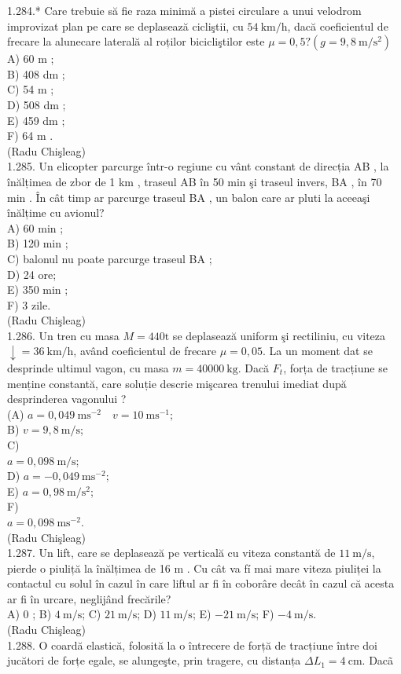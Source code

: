 {1.284.* Care trebuie să fie raza minimă a pistei circulare a unui velodrom improvizat plan pe care se deplasează cicliştii, cu $54 \mathrm{~km} / \mathrm{h}$, dacă coeficientul de frecare la alunecare laterală al roților bicicliştilor este $\mu=0,5 ?\left(g=9,8 \mathrm{~m} / \mathrm{s}^{2}\right)$\\
A) 60 m ;\\
B) 408 dm ;\\
C) 54 m ;\\
D) 508 dm ;\\
E) 459 dm ;\\
F) 64 m .\\
(Radu Chişleag)\\
1.285. Un elicopter parcurge într-o regiune cu vânt constant de direcția AB , la înălțimea de zbor de 1 km , traseul AB în 50 min şi traseul invers, BA , în 70 min . În cât timp ar parcurge traseul BA , un balon care ar pluti la aceeaşi înălțime cu avionul?\\
A) 60 min ;\\
B) 120 min ;\\
C) balonul nu poate parcurge traseul BA ;\\
D) 24 ore;\\
E) 350 min ;\\
F) 3 zile.\\
(Radu Chişleag)\\
1.286. Un tren cu masa $M=440 \mathrm{t}$ se deplasează uniform şi rectiliniu, cu viteza $\downarrow=36 \mathrm{~km} / \mathrm{h}$, având coeficientul de frecare $\mu=0,05$. La un moment dat se desprinde ultimul vagon, cu masa $m=40000 \mathrm{~kg}$. Dacă $F_{t}$, forța de tracțiune se menține constantă, care soluție descrie mişcarea trenului imediat după desprinderea vagonului ?\\
(A) $a=0,049 \mathrm{~ms}^{-2} \quad v=10 \mathrm{~ms}^{-1} ;$\\
B) $v=9,8 \mathrm{~m} / \mathrm{s}$;\\
C)\\
$a=0,098 \mathrm{~m} / \mathrm{s}$;\\
D) $a=-0,049 \mathrm{~ms}^{-2}$;\\
E) $a=0,98 \mathrm{~m} / \mathrm{s}^{2}$;\\
F)\\
$a=0,098 \mathrm{~ms}^{-2}$.\\
(Radu Chişleag)\\
1.287. Un lift, care se deplasează pe verticală cu viteza constantă de $11 \mathrm{~m} / \mathrm{s}$, pierde o piuliță la înălțimea de 16 m . Cu cât va fí mai mare viteza piuliței la contactul cu solul în cazul în care liftul ar fi în coborâre decât în cazul că acesta ar fi în urcare, neglijând frecările?\\
A) 0 ; B) $4 \mathrm{~m} / \mathrm{s}$; C) $21 \mathrm{~m} / \mathrm{s}$; D) $11 \mathrm{~m} / \mathrm{s}$; E) $-21 \mathrm{~m} / \mathrm{s}$; F) $-4 \mathrm{~m} / \mathrm{s}$.\\
(Radu Chişleag)\\
1.288. O coardă elastică, folosită la o întrecere de forță de tracțiune între doi jucători de forțe egale, se alungeşte, prin tragere, cu distanța $\Delta L_{1}=4 \mathrm{~cm}$. Dacã

}
